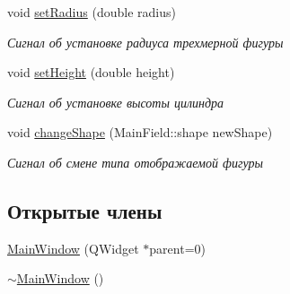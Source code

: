 \begin{DoxyCompactItemize}
\mbox{\label{class_main_window_a1614152404552fa9d38f4c8ada7222f2}} 
void \mbox{\hyperlink{class_main_window_a1614152404552fa9d38f4c8ada7222f2}{set\+Radius}} (double radius)
\begin{DoxyCompactList}\small\item\em Сигнал об установке радиуса трехмерной фигуры \end{DoxyCompactList}\item 
\mbox{\label{class_main_window_abc10c7f04238887be42e494420450a70}} 
void \mbox{\hyperlink{class_main_window_abc10c7f04238887be42e494420450a70}{set\+Height}} (double height)
\begin{DoxyCompactList}\small\item\em Сигнал об установке высоты цилиндра \end{DoxyCompactList}\item 
\mbox{\label{class_main_window_a388c424a7fdd4ec3c80a7c8fcb5a834e}} 
void \mbox{\hyperlink{class_main_window_a388c424a7fdd4ec3c80a7c8fcb5a834e}{change\+Shape}} (Main\+Field\+::shape new\+Shape)
\begin{DoxyCompactList}\small\item\em Сигнал об смене типа отображаемой фигуры \end{DoxyCompactList}\end{DoxyCompactItemize}
\subsection*{Открытые члены}
\begin{DoxyCompactItemize}
\item 
\mbox{\hyperlink{class_main_window_a8b244be8b7b7db1b08de2a2acb9409db}{Main\+Window}} (Q\+Widget $\ast$parent=0)
\item 
\mbox{\hyperlink{class_main_window_ae98d00a93bc118200eeef9f9bba1dba7}{$\sim$\+Main\+Window}} ()
\end{DoxyCompactItemize}
